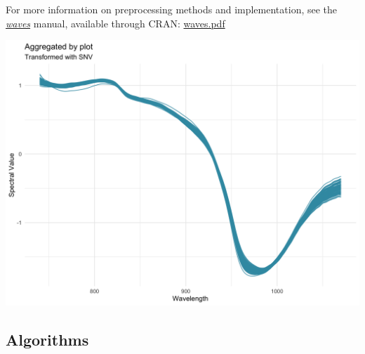 \documentclass[
  12pt,
]{book}
\begin{document}
For more information on preprocessing methods and implementation, see the \href{https://CRAN.R-project.org/package=waves}{\emph{waves}} manual, available through CRAN: \href{https://cran.r-project.org/web/packages/waves/waves.pdf}{waves.pdf}

\begin{center}\includegraphics[width=0.95\linewidth]{assets/images/manage_NIRS_snv} \end{center}

\hypertarget{algorithms}{%
\subsection{Algorithms}\label{algorithms}}
\end{document}
